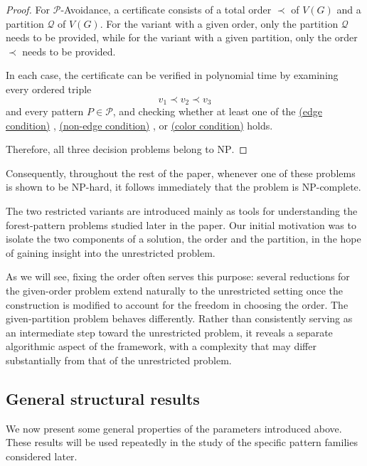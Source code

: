\documentclass[12pt]{article}
\theoremstyle{plain}
\theoremstyle{definition}
\theoremstyle{remark}
\theoremstyle{definition}
\newcommand{\edgecondition}{%
  \hyperref[def:avoid:cond:edge]{(edge condition)}\xspace
}
\newcommand{\nonedgecondition}{%
  \hyperref[def:avoid:cond:nonedge]{(non-edge condition)}\xspace
}
\newcommand{\colorcondition}{%
  \hyperref[def:avoid:cond:color]{(color condition)}\xspace
}
\begin{document}
\begin{proof}
For \(\mathcal P\)-Avoidance, a certificate consists of a total order
\(\prec\) of \(V(G)\) and a partition \(\mathcal Q\) of \(V(G)\).
For the variant with a given order, only the partition \(\mathcal Q\)
needs to be provided, while for the variant with a given partition, only
the order \(\prec\) needs to be provided.

In each case, the certificate can be verified in polynomial time by
examining every ordered triple
\[
v_1\prec v_2\prec v_3
\]
and every pattern \(P\in\mathcal P\), and checking whether at least one of
the \edgecondition{}, \nonedgecondition{}, or \colorcondition{} holds.

Therefore, all three decision problems belong to \(\mathrm{NP}\).
\end{proof}

Consequently, throughout the rest of the paper, whenever one of these
problems is shown to be NP-hard, it follows immediately that the problem
is NP-complete.



The two restricted variants are introduced mainly as tools for understanding
the forest-pattern problems studied later in the paper. Our initial motivation
was to isolate the two components of a solution, the order and the partition,
in the hope of gaining insight into the unrestricted problem.

As we will see, fixing the order often serves this purpose: several reductions
for the given-order problem extend naturally to the unrestricted setting once
the construction is modified to account for the freedom in choosing the order.
The given-partition problem behaves differently. Rather than consistently
serving as an intermediate step toward the unrestricted problem, it reveals
a separate algorithmic aspect of the framework, with a complexity that may
differ substantially from that of the unrestricted problem.



\subsection{General structural results}
\label{subsec:general-structural-results}



We now present some general properties of the parameters introduced above.
These results will be used repeatedly in the study of the specific pattern
families considered later.
\end{document}
